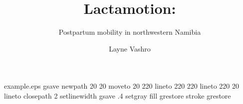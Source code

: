 %
%
%
%
%
\begin{filecontents*}{example.eps}
gsave
newpath
  20 20 moveto
  20 220 lineto
  220 220 lineto
  220 20 lineto
closepath
2 setlinewidth
gsave
  .4 setgray fill
grestore
stroke
grestore
\end{filecontents*}
%
\RequirePackage{fix-cm}
%
\documentclass[smallextended]{svjour3}       %
%
\smartqed  %
%
\usepackage{graphicx}
%
%
%
%
%


\title{Lactamotion:%
}
\subtitle{Postpartum mobility in northwestern Namibia}


\author{Layne Vashro
}



